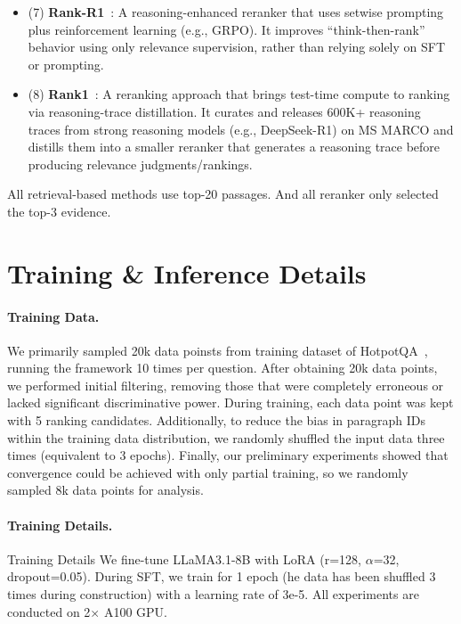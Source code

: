 \documentclass[11pt]{article}
\begin{document}
\begin{itemize}[label={}]
    \item (7) \textbf{Rank-R1}~\citep{zhuang2025rank}: A reasoning-enhanced reranker that uses setwise prompting plus reinforcement learning (e.g., GRPO). It improves “think-then-rank” behavior using only relevance supervision, rather than relying solely on SFT or prompting.
    
    \item (8) \textbf{Rank1}~\citep{weller2025rank1}: A reranking approach that brings test-time compute to ranking via reasoning-trace distillation. It curates and releases 600K+ reasoning traces from strong reasoning models (e.g., DeepSeek-R1) on MS MARCO and distills them into a smaller reranker that generates a reasoning trace before producing relevance judgments/rankings. 
\end{itemize}
All retrieval-based methods use top-20 passages. 
And all reranker only selected the top-3 evidence. 

\section{Training \& Inference Details}
\label{sec:appendix-train}
\paragraph{Training Data.} We primarily sampled 20k data poinsts from training dataset of HotpotQA~\citep{yang2018hotpotqa}, running the framework 10 times per question. 
After obtaining 20k data points, we performed initial filtering, removing those that were completely erroneous or lacked significant discriminative power. During training, each data point was kept with 5 ranking candidates. Additionally, to reduce the bias in paragraph IDs within the training data distribution, we randomly shuffled the input data three times (equivalent to 3 epochs). Finally, our preliminary experiments showed that convergence could be achieved with only partial training, so we randomly sampled 8k data points for analysis.


\paragraph{Training Details.} Training Details We fine-tune LLaMA3.1-8B with LoRA (r=128, $\alpha$=32, dropout=0.05). During SFT, we train for 1 epoch (he data has been shuffled 3 times during construction) with a learning rate of 3e-5. All experiments are
conducted on 2$\times$ A100 GPU. 
\end{document}
